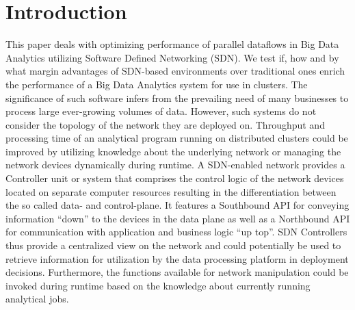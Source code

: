 \section{Introduction}
This paper deals with optimizing performance of parallel dataflows in Big Data Analytics utilizing
Software Defined Networking (SDN). We test if, how and by what margin advantages of SDN-based
environments over traditional ones enrich the performance of a Big Data Analytics system for use in
clusters. The significance of such software infers from the prevailing need of many businesses to
process large ever-growing volumes of data. However, such systems do not consider the topology of
the network they are deployed on. Throughput and processing time of an analytical program running on
distributed clusters could be improved by utilizing knowledge about the underlying network or
managing the network devices dynamically during runtime. A SDN-enabled network provides a Controller
unit or system that comprises the control logic of the network devices located on separate computer
resources resulting in the differentiation between the so called data- and control-plane. It
features a Southbound API for conveying information “down” to the devices in the data plane as well
as a Northbound API for communication with application and business logic “up top”. SDN Controllers
thus provide a centralized view on the network and could potentially be used to retrieve information
for utilization by the data processing platform in deployment decisions. Furthermore, the functions
available for network manipulation could be invoked during runtime based on the knowledge about
currently running analytical jobs.
